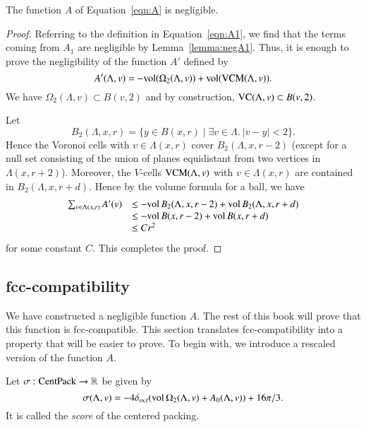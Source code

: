 \begin{theorem}\label{lemma:negligible}
The function $A$ of Equation~\ref{eqn:A} is negligible.
\end{theorem}

\begin{proof}   
Referring to the definition in Equation~\ref{eqn:A1}, we find that
the terms coming from $A_1$ are negligible by
Lemma~\ref{lemma:negA1}.  Thus, it is enough to prove the
negligibility of the function $A'$ defined by
      $$
      A'(\Lambda,v) = -{\operatorname{vol}}(\Omega_2(\Lambda,v))+
         {\operatorname{vol}}({\operatorname{VCM}}(\Lambda,v)).$$
We
have $\Omega_2(\Lambda,v)\subset B(v,2)$ and by
construction, 
${\operatorname{VC}}(\Lambda,v)\subset B(v,2)$. 

Let 
  $$
  B_2(\Lambda,x,r) = \{y \in B(x,r)\mid \exists v\in \Lambda.\ 
         |v-y| < 2\}.
  $$
Hence the Voronoi cells with
$v\in \Lambda(x,r)$ cover $B_2(\Lambda,x,r-2)$ (except for a null set
consisting of the union of planes equidistant from two vertices in
$\Lambda(x,r+2)$). Moreover, the $V$-cells ${\operatorname{VCM}}(\Lambda,v)$
with $v\in \Lambda(x,r)$ are contained in $B_2(\Lambda,x,r+d)$.  Hence by
the volume formula for a ball, we have
   $$
   \begin{array}{lll}
   \sum_{v\in\Lambda(x,r)} A'(v) &\le 
     -{\operatorname{vol}}\,B_2(\Lambda,x,r-2)
      +{\operatorname{vol}}\,B_2(\Lambda,x,r+d)\\&\le 
       -{\operatorname{vol}}\,B(x,r-2)
      +{\operatorname{vol}}\,B(x,r+d)\\& \le 
      C r^2
      \end{array}
   $$
for some constant $C$. This completes the proof.
\end{proof}


\subsection{fcc-compatibility}

We have constructed a negligible function $A$.  The rest of this
book will prove that this function is fcc-compatible.   This
section translates fcc-compatibility into a property that will be
easier to prove.  To begin with, we introduce a rescaled version
of the function $A$.

\begin{definition}[score,~$\sigma$]\label{def:score}
Let $\sigma:{\operatorname{CentPack}}\to\mathbb{R}$ be given by
   $$\sigma(\Lambda,v) = -4\delta_{oct} ({\operatorname{vol}}\,\Omega_2(\Lambda,v) + A_0(\Lambda,v)) +
   16\pi/3.$$
It is called the {\it score} of the centered packing.
%
\end{definition}

